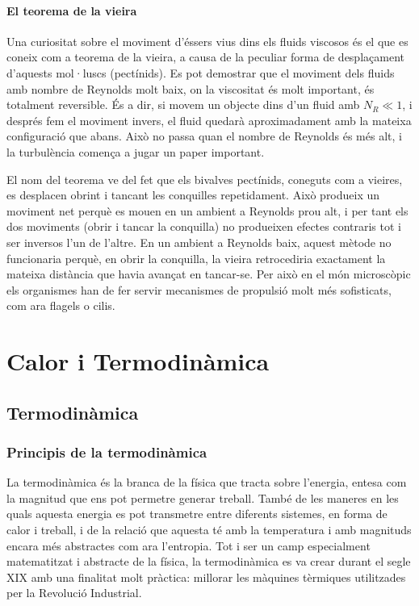 \documentclass[12pt]{book}
\begin{document}
\subsection{El teorema de la vieira}

Una curiositat sobre el moviment d'éssers vius dins els fluids viscosos és el que es coneix com a teorema de la vieira, a causa de la peculiar forma de desplaçament d'aquests mol·luscs (pectínids). Es pot demostrar que el moviment dels fluids amb nombre de Reynolds molt baix, on la viscositat és molt important, és totalment reversible. És a dir, si movem un objecte dins d'un fluid amb $N_R \ll 1$, i després fem el moviment invers, el fluid quedarà aproximadament amb la mateixa configuració que abans. Això no passa quan el nombre de Reynolds és més alt, i la turbulència comença a jugar un paper important.

El nom del teorema ve del fet que els bivalves pectínids, coneguts com a vieires, es desplacen obrint i tancant les conquilles repetidament. Això produeix un moviment net perquè es mouen en un ambient a Reynolds prou alt, i per tant els dos moviments (obrir i tancar la conquilla) no produeixen efectes contraris tot i ser inversos l'un de l'altre. En un ambient a Reynolds baix, aquest mètode no funcionaria perquè, en obrir la conquilla, la vieira retrocediria exactament la mateixa distància que havia avançat en tancar-se. Per això en el món microscòpic els organismes han de fer servir mecanismes de propulsió molt més sofisticats, com ara flagels o cilis.



\part{Calor i Termodinàmica}

\chapter{Termodinàmica}
\label{chap:Termodinamica}

\section{Principis de la termodinàmica}

La termodinàmica és la branca de la física que tracta sobre l'energia, entesa com la magnitud que ens pot permetre generar treball. També de les maneres en les quals aquesta energia es pot transmetre entre diferents sistemes, en forma de calor i treball, i de la relació que aquesta té amb la temperatura i amb magnituds encara més abstractes com ara l'entropia. Tot i ser un camp especialment matematitzat i abstracte de la física, la termodinàmica es va crear durant el segle XIX amb una finalitat molt pràctica: millorar les màquines tèrmiques utilitzades per la Revolució Industrial. 
\end{document}
